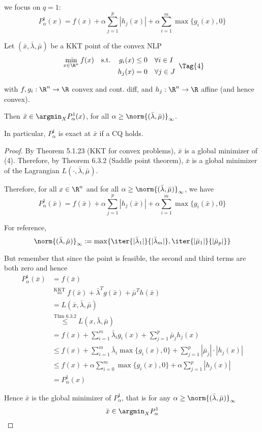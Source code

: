 we focus on $q=1$:
$$
  P_\alpha^1(x)=f(x)+\alpha\sum_{j=1}^p|h_j(x)| + \alpha\sum_{i=1}^m\max\{g_i(x),0\}
$$

\label{d2d5221}

Let $(\bar x,\bar\lambda,\bar\mu)$ be a KKT point of the convex NLP
\begin{equation*}
  \NlpStdForm\Tag{4}
\end{equation*}

with $f,g_i:\R^n\to\R$ convex and cont. diff, and $h_j:\R^n\to\R$ affine (and
hence convex).

Then $\bar x\in\argmin_XP_\alpha^1(x)$, for all
$\alpha\geq\norm{(\bar\lambda,\bar\mu)}_\infty$.

In particular, $P_\alpha^1$ is exact at $\bar x$ if a CQ holds.

\begin{proof}
  By Theorem 5.1.23 (KKT for convex problems), $\bar x$ is a global minimizer of
  (4). Therefore, by Theorem 6.3.2 (Saddle point theorem), $\bar x$ is a global
  minimizer of the Lagrangian $L(\cdot,\bar\lambda,\bar\mu)$.

  Therefore, for all $x\in\R^n$ and for all
  $\alpha\geq\norm{(\bar\lambda,\bar\mu)}_\infty$, we have
  $$
    P_\alpha^1(\bar x)=f(\bar x)+\alpha\sum_{j=1}^p|h_j(\bar x)| + \alpha\sum_{i=1}^m\max\{g_i(\bar x),0\}
  $$

  For reference,
  $$
    \norm{(\bar\lambda,\bar\mu)}_\infty:=\max\{
    \iter{|\bar\lambda_1|}{|\bar\lambda_m|},
    \iter{|\bar\mu_1|}{|\bar\mu_p|}
    \}
  $$

  But remember that since the point is feasible, the second and third terms are
  both zero and hence
  \begin{align*}
    P_\alpha^1(\bar x)
     & =f(\bar x)                                                                               \\
     & \stackrel{\text{KKT}}{=}f(\bar x)+\bar\lambda^Tg(\bar x)+\bar\mu^Th(\bar x)              \\
     & = L(\bar x,\bar\lambda,\bar\mu)                                                          \\
     & \stackrel{\text{Thm 6.3.2}}{\leq} L(x,\bar\lambda,\bar\mu)                               \\
     & = f(x)+\sum_{i=1}^m\bar\lambda_ig_i(x)+\sum_{j=1}^p\bar\mu_jh_j(x)                       \\
     & \leq f(x)+\sum_{i=1}^m\bar\lambda_i\max\{g_i(x),0\}+\sum_{j=1}^p|\bar\mu_j|\cdot|h_j(x)| \\
     & \leq f(x)+\alpha\sum_{i=0}^m\max\{g_i(x),0\}+\alpha\sum_{j=1}^p|h_j(x)|                  \\
     & = P_\alpha^1(x)
  \end{align*}

  Hence $\bar x$ is the global minimizer of $P_\alpha^1$, that is for any
  $\alpha\geq\norm{(\bar\lambda,\bar\mu)}_\infty$
  $$
    \bar x\in\argmin_XP_\alpha^1
  $$
\end{proof}

